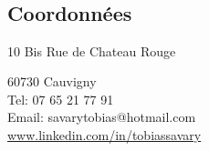 \documentclass[9pt, oneside, a4paper, titlepage]{extarticle}
\begin{document}
    \begin{tcolorbox}
        \vspace*{0.2cm}
        \hspace*{0.7mm}
        \begin{minipage}[t]{6.2cm}
            \begin{spacing}{0.95}
            \vspace*{-0.5cm}
            \begin{tcolorbox}[grow to left by = 0.6cm, colback = gray!25, colframe = white]
                
                \section*{\\Coordonnées}
                \hspace*{0.4cm}
                10 Bis Rue de Chateau Rouge

                \hspace*{0.4cm}
                \vspace*{0.2cm}
                60730 Cauvigny\\
                \hspace*{0.4cm}
                Tel: 07 65 21 77 91\\
                \hspace*{0.4cm}
                Email: savarytobias@hotmail.com\\
                
                
                \vspace*{0.1cm}
                \hspace*{0.4cm} \href{www.linkedin.com/in/tobiassavary}{www.linkedin.com/in/tobiassavary}
                \vspace*{0.2cm}


\end{tcolorbox}
\end{spacing}
\end{minipage}
\end{tcolorbox}
\end{document}
